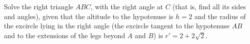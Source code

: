 Solve the right triangle $ABC$, with the right angle at $C$ (that is, find all its sides and angles), given that the altitude to the hypotenuse is $h=2$ and the radius of the excircle lying in the right angle (the excircle tangent to the hypotenuse $AB$ and to the extensions of the legs beyond $A$ and $B$) is $r'=2+2\sqrt2$.

